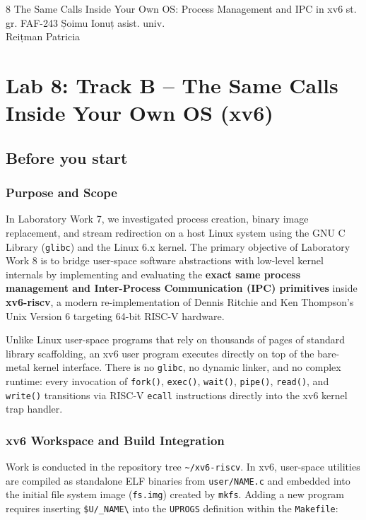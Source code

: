 \documentclass{labreport}
\begin{document}
\labtitle
    {8}
    {The Same Calls Inside Your Own OS: Process Management and IPC in xv6}
    {st. gr. FAF-243}
    {Șoimu Ionuț}
    {asist. univ.\\[0.15cm] Reițman Patricia}

\tableofcontents
\newpage

\section{Lab 8: Track B -- The Same Calls Inside Your Own OS (xv6)}

\subsection{Before you start}

\subsubsection*{Purpose and Scope}
In Laboratory Work 7, we investigated process creation, binary image replacement, and stream redirection on a host Linux system using the GNU C Library (\texttt{glibc}) and the Linux 6.x kernel. The primary objective of Laboratory Work 8 is to bridge user-space software abstractions with low-level kernel internals by implementing and evaluating the \textbf{exact same process management and Inter-Process Communication (IPC) primitives} inside \textbf{xv6-riscv}, a modern re-implementation of Dennis Ritchie and Ken Thompson's Unix Version 6 targeting 64-bit RISC-V hardware.

Unlike Linux user-space programs that rely on thousands of pages of standard library scaffolding, an xv6 user program executes directly on top of the bare-metal kernel interface. There is no \texttt{glibc}, no dynamic linker, and no complex runtime: every invocation of \texttt{fork()}, \texttt{exec()}, \texttt{wait()}, \texttt{pipe()}, \texttt{read()}, and \texttt{write()} transitions via RISC-V \texttt{ecall} instructions directly into the xv6 kernel trap handler.

\subsubsection*{xv6 Workspace and Build Integration}
Work is conducted in the repository tree \texttt{\textasciitilde/xv6-riscv}. In xv6, user-space utilities are compiled as standalone ELF binaries from \texttt{user/NAME.c} and embedded into the initial file system image (\texttt{fs.img}) created by \texttt{mkfs}. Adding a new program requires inserting \texttt{\$U/\_NAME\textbackslash} into the \texttt{UPROGS} definition within the \texttt{Makefile}:
\end{document}
